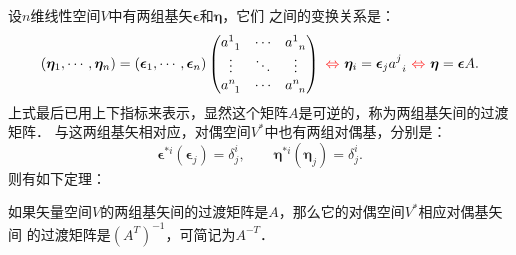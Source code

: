 设$n$维线性空间$V$中有两组基矢$\boldsymbol{\epsilon}$和$\boldsymbol{\eta}$，它们
之间的变换关系是：
\begin{equation*}
    \left(\boldsymbol{\eta}_1,\cdots,\boldsymbol{\eta}_n\right) =
    \left(\boldsymbol{\epsilon}_1,\cdots,\boldsymbol{\epsilon}_n\right)
    \begin{pmatrix}
        a^{1}_{\hphantom{a} 1} & \cdots & a^{1}_{\hphantom{a} n} \\
        \vdots & \ddots & \vdots \\
        a^{n}_{\hphantom{a} 1} & \cdots & a^{n}_{\hphantom{a} n} \\
    \end{pmatrix}  {\ \color{red}\Leftrightarrow \  }
    \boldsymbol{\eta}_i = \boldsymbol{\epsilon}_j a^{j}_{\hphantom{a} i}
    {\  \color{red}\Leftrightarrow \  }  
    \boldsymbol{\eta} = \boldsymbol{\epsilon} A   .
\end{equation*}
上式最后已用上下指标来表示，显然这个矩阵$A$是可逆的，称为两组基矢间的{\heiti 过渡矩阵}．
与这两组基矢相对应，对偶空间$V^*$中也有两组对偶基，分别是：
\begin{equation}
    \boldsymbol{\epsilon}^{*i}(\boldsymbol{\epsilon}_j) = \delta^i _j , \qquad
    \boldsymbol{\eta}^{*i}(\boldsymbol{\eta}_j) = \delta^i _j .
\end{equation}
则有如下定理：   
\begin{theorem}\label{chmla:thm_inv-cov-base}
    如果矢量空间$V$的两组基矢间的过渡矩阵是$A$，那么它的对偶空间$V^*$相应对偶基矢间
    的过渡矩阵是$(A^T)^{-1}$，可简记为$A^{-T}$．
\end{theorem}
